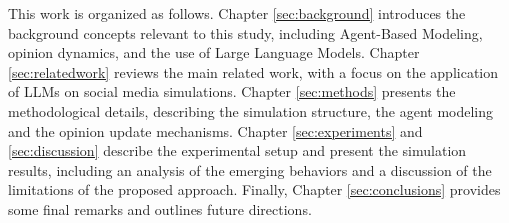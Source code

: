 \medskip
This work is organized as follows.
Chapter \ref{sec:background} introduces the background concepts relevant to this study, including Agent-Based Modeling, opinion dynamics, and the use of Large Language Models.
Chapter \ref{sec:relatedwork} reviews the main related work, with a focus on the application of LLMs on social media simulations.
Chapter \ref{sec:methods} presents the methodological details, describing the simulation structure, the agent modeling and the opinion update mechanisms.
Chapter \ref{sec:experiments} and \ref{sec:discussion} describe the experimental setup and present the simulation results, including an analysis of the emerging behaviors and a discussion of the limitations of the proposed approach.
Finally, Chapter \ref{sec:conclusions} provides some final remarks and outlines future directions.





